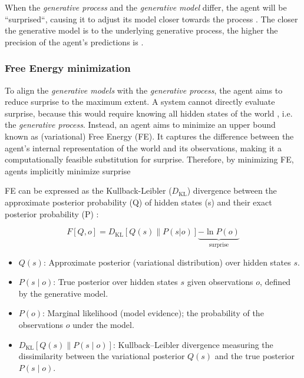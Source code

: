 When the \textit{generative process} and the \textit{generative model} differ, the agent will be ``surprised``, causing it to adjust its model closer towards the process \cite{bruineberg_free-energy_2018}. The closer the generative model is to the underlying generative process, the higher the precision of the agent's predictions is \cite{sedlak_active_2024}.

\subsubsection{Free Energy minimization}
To align the \textit{generative models} with the \textit{generative process}, the agent aims to reduce surprise to the maximum extent. A system cannot directly evaluate surprise, because this would require knowing all hidden states of the world \cite{friston_free-energy_2009}, i.e. the \textit{generative process}. Instead, an agent aims to 
minimize an upper bound \cite{smith_step-by-step_2022} known as (variational) Free Energy (FE). It captures the difference between the agent's internal representation of the world and its observations, making it a computationally feasible substitution for surprise. Therefore, by minimizing FE, agents implicitly minimize surprise \cite{friston_free-energy_2010}

FE can be expressed as the Kullback-Leibler (\(D_\mathrm{KL}\)) divergence between the approximate posterior probability (Q) of hidden states (s) and their exact posterior probability (P) \cite{parr_active_2022,sajid_active_2021}:

\[
F\left[Q, o\right] = D_\mathrm{KL}[Q(s) \parallel P(s|o)] \underbrace{ - \ln P(o)}_{\text{surprise}}
\]

\begin{itemize}
  \item \( Q(s) \): Approximate posterior (variational distribution) over hidden states \(s\).
  \item \( P(s \mid o) \): True posterior over hidden states  \(s\) given observations \(o\), defined by the generative model.
  \item \( P(o) \): Marginal likelihood (model evidence); the probability of the observations \(o\) under the  model.
  \item \( D_\mathrm{KL}\left[ Q(s) \parallel P(s \mid o) \right] \): Kullback–Leibler divergence measuring the dissimilarity between the variational posterior \( Q(s) \) and the true posterior \( P(s \mid o) \).
\end{itemize}

